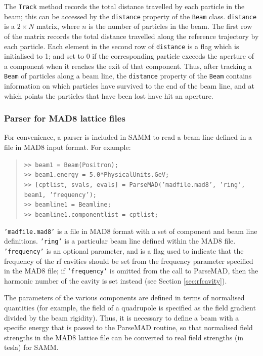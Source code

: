 \documentclass[11pt,twoside,a4paper]{article}
\begin{document}
The \texttt{Track} method records the total distance travelled by each particle
in the beam; this can be accessed by the \texttt{distance} property of the
\texttt{Beam} class.  \texttt{distance} is a $2\times N$ matrix, where $n$ is
the number of particles in the beam.  The first row of the matrix records the
total distance travelled along the reference trajectory by each particle.  Each
element in the second row of \texttt{distance} is a flag which is initialised to
1; and set to 0 if the corresponding particle exceeds the aperture of a component
when it reaches the exit of that component.  Thus, after tracking a \texttt{Beam} of
particles along a beam line, the \texttt{distance} property of the \texttt{Beam}
contains information on which particles have survived to the end of the beam
line, and at which points the particles that have been lost have hit an aperture.


\subsubsection{Parser for MAD8 lattice files}

For convenience, a parser is included in SAMM to read a beam line defined
in a file in MAD8\cite{cite:mad8} input format.  For example:
\begin{quote}
\texttt{>> beam1 = Beam(Positron);} \\
\texttt{>> beam1.energy = 5.0*PhysicalUnits.GeV;} \\
\texttt{>> [cptlist, svals, evals] = ParseMAD('madfile.mad8', 'ring', beam1, 'frequency');} \\
\texttt{>> beamline1 = Beamline;} \\
\texttt{>> beamline1.componentlist = cptlist;}
\end{quote}
\texttt{'madfile.mad8'} is a file in MAD8 format with a set of component and beam
line definitions.  \texttt{'ring'} is a particular beam line defined within the MAD8 file.
\texttt{'frequency'} is an optional parameter, and is a flag used to indicate that the
frequency of the rf cavities should be set from the frequency parameter specified
in the MAD8 file; if \texttt{'frequency'} is omitted from the call to ParseMAD, then
the harmonic number of the cavity is set instead (see Section \ref{sec:rfcavity}).

The parameters of the various components are defined in terms of normalised
quantities (for example, the field of a quadrupole is specified as the field gradient
divided by the beam rigidity).  Thus, it is necessary to define a beam with a 
specific energy that is passed to the ParseMAD routine, so that normalised field
strengths in the MAD8 lattice file can be converted to real field strengths (in tesla)
for SAMM.
\end{document}
